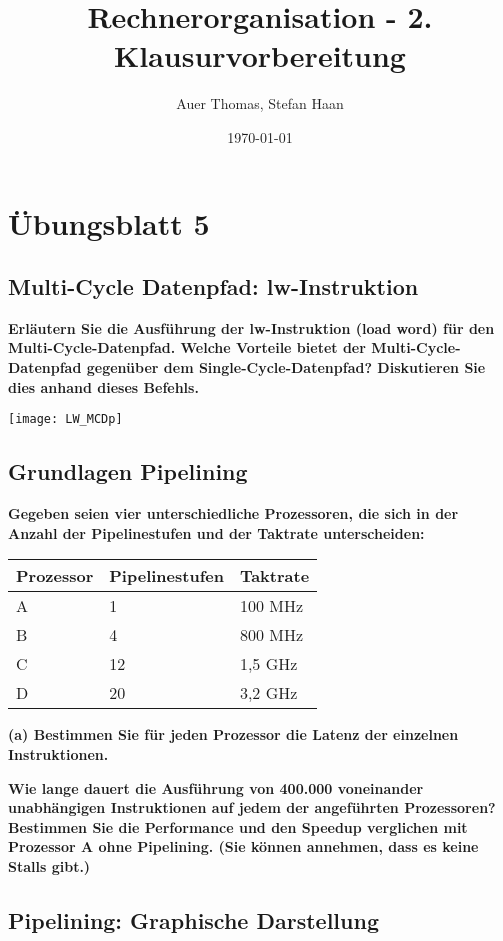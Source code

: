 \documentclass[11pt]{article}
\title{Rechnerorganisation - 2. Klausurvorbereitung}
\author{Auer Thomas, Stefan Haan}
\date{\today}
\begin{document}
\maketitle
\tableofcontents
\graphicspath{{graphics/}}

\setcounter{section}{4}
\pagebreak

\section{Übungsblatt 5}
    \subsection{Multi-Cycle Datenpfad: lw-Instruktion}
    \textbf{Erläutern Sie die Ausführung der lw-Instruktion (load word) für den Multi-Cycle-Datenpfad.
    Welche Vorteile bietet der Multi-Cycle-Datenpfad gegenüber dem Single-Cycle-Datenpfad?
    Diskutieren Sie dies anhand dieses Befehls.}

    \texttt{[image: LW\_MCDp]}

    \subsection{Grundlagen Pipelining}
    \textbf{Gegeben seien vier unterschiedliche Prozessoren, die sich in der Anzahl der Pipelinestufen und
    der Taktrate unterscheiden:\\}
    \begin{center}
        \begin{tabular}{l|l|l}
        Prozessor & Pipelinestufen & Taktrate \\\hline
        A & 1 & 100 MHz \\
        B & 4 & 800 MHz \\
        C & 12 & 1,5 GHz \\
        D & 20 & 3,2 GHz \\
        \end{tabular}
    \end{center}
    \textbf{(a) Bestimmen Sie für jeden Prozessor die Latenz der einzelnen Instruktionen.}
    
    \textbf{Wie lange dauert die Ausführung von 400.000 voneinander unabhängigen Instruktionen
    auf jedem der angeführten Prozessoren? Bestimmen Sie die Performance und den
    Speedup verglichen mit Prozessor A ohne Pipelining. (Sie können annehmen, dass es
    keine Stalls gibt.)}

    \subsection{Pipelining: Graphische Darstellung}
\end{document}
